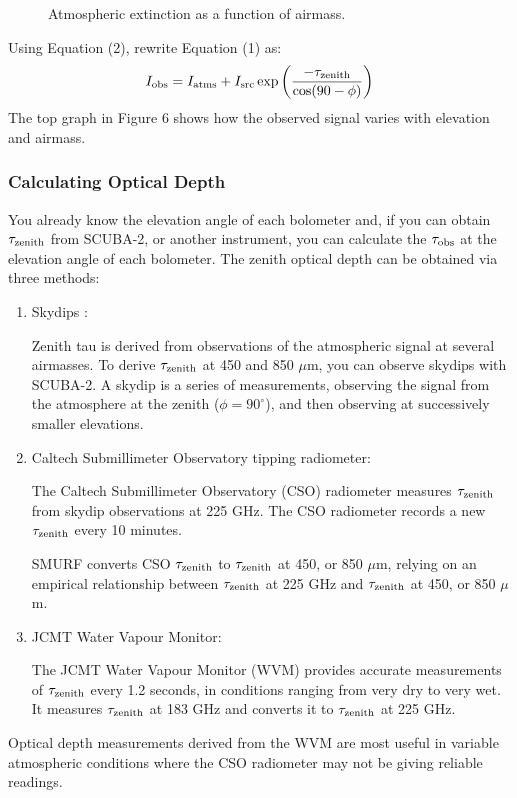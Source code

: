\documentclass[twoside,11pt]{article}
\renewcommand{\_}{\texttt{\symbol{95}}}
\begin{document}
\begin{figure}
\caption{Atmospheric extinction as a function of airmass.}
\end{figure}

Using Equation (2), rewrite Equation (1) as:
\begin{equation}
I_{\rm obs} = I_{\rm atms} + I_{\rm src} \exp \left( 
\frac{-\tau_{\rm zenith}}{\cos(90-\phi)}\right)
\end{equation}
The top graph in Figure 6 shows how the observed signal varies with elevation
and airmass.

\subsubsection{Calculating Optical Depth}

You already know the elevation angle of each bolometer and, if you can
obtain $\tau_{\rm zenith}$ from SCUBA-2, or another instrument, you
can calculate the $\tau_{\rm obs}$ at the elevation angle of each
bolometer. The zenith optical depth can be obtained via three methods:
\begin{enumerate}
\item Skydips :

Zenith tau is derived from observations of the atmospheric signal at
several airmasses. To derive $\tau_{\rm zenith}$ at 450 and 850
$\mu$m, you can observe skydips with SCUBA-2.  A skydip is a series of
measurements, observing the signal from the atmosphere at the zenith
($\phi = 90^\circ$), and then observing at successively smaller
elevations.

\item Caltech Submillimeter Observatory tipping radiometer:

The Caltech Submillimeter Observatory (CSO) radiometer measures
$\tau_{\rm zenith}$ from skydip observations at 225 GHz. The CSO
radiometer records a new $\tau_{\rm zenith}$ every 10 minutes.

SMURF converts CSO $\tau_{\rm zenith}$ to $\tau_{\rm zenith}$ at 450,
or 850 $\mu$m, relying on an empirical relationship between $\tau_{\rm
  zenith}$ at 225 GHz and $\tau_{\rm zenith}$ at 450, or 850 $\mu$m.

\item JCMT Water Vapour Monitor:

The JCMT Water Vapour Monitor (WVM) provides accurate measurements of
$\tau_{\rm zenith}$ every 1.2 seconds, in conditions ranging from very
dry to very wet. It measures $\tau_{\rm zenith}$ at 183 GHz and
converts it to $\tau_{\rm zenith}$ at 225 GHz.

\end{enumerate}
Optical depth measurements derived from the WVM are most useful in
variable atmospheric conditions where the CSO radiometer may not be
giving reliable readings.
\end{document}
